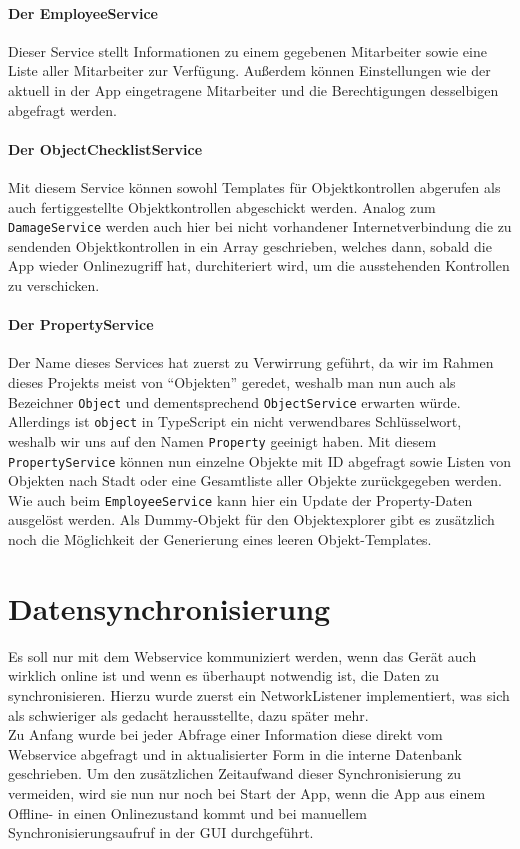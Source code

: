 \documentclass[12pt]{article}
\begin{document}
\paragraph{Der EmployeeService} Dieser Service stellt Informationen zu einem gegebenen Mitarbeiter sowie eine Liste aller Mitarbeiter zur Verfügung. Außerdem können Einstellungen wie der aktuell in der App eingetragene Mitarbeiter und die Berechtigungen desselbigen abgefragt werden.
\paragraph{Der ObjectChecklistService} Mit diesem Service können sowohl Templates für Objektkontrollen abgerufen als auch fertiggestellte Objektkontrollen abgeschickt werden. Analog zum \texttt{DamageService} werden auch hier bei nicht vorhandener Internetverbindung die zu sendenden Objektkontrollen in ein Array geschrieben, welches dann, sobald die App wieder Onlinezugriff hat, durchiteriert wird, um die ausstehenden Kontrollen zu verschicken.
\paragraph{Der PropertyService} Der Name dieses Services hat zuerst zu Verwirrung geführt, da wir im Rahmen dieses Projekts meist von ``Objekten'' geredet, weshalb man nun auch als Bezeichner \texttt{Object} und dementsprechend \texttt{ObjectService} erwarten würde. Allerdings ist \texttt{object} in TypeScript ein nicht verwendbares Schlüsselwort, weshalb wir uns auf den Namen \texttt{Property} geeinigt haben. Mit diesem \texttt{PropertyService} können nun einzelne Objekte mit ID abgefragt sowie Listen von Objekten nach Stadt oder eine Gesamtliste aller Objekte zurückgegeben werden. Wie auch beim \texttt{EmployeeService} kann hier ein Update der Property-Daten ausgelöst werden. Als Dummy-Objekt für den Objektexplorer gibt es zusätzlich noch die Möglichkeit der Generierung eines leeren Objekt-Templates.

\section{Datensynchronisierung}
Es soll nur mit dem Webservice kommuniziert werden, wenn das Gerät auch wirklich online ist und wenn es überhaupt notwendig ist, die Daten zu synchronisieren. Hierzu wurde zuerst ein NetworkListener implementiert, was sich als schwieriger als gedacht herausstellte, dazu später mehr.\\
Zu Anfang wurde bei jeder Abfrage einer Information diese direkt vom Webservice abgefragt und in aktualisierter Form in die interne Datenbank geschrieben. Um den zusätzlichen Zeitaufwand dieser Synchronisierung zu vermeiden, wird sie nun nur noch bei Start der App, wenn die App aus einem Offline- in einen Onlinezustand kommt und bei manuellem Synchronisierungsaufruf in der GUI durchgeführt. 
\end{document}
